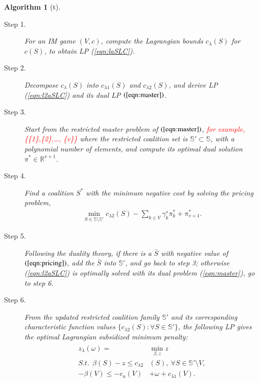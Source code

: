 \documentclass[authoryear,review,12pt]{elsarticle}
\newtheorem{algorithm}{Algorithm}
\newcommand{\R}{\mathbb{R}}
\begin{document}
\renewcommand{\baselinestretch}{1.5}
\begin{algorithm}[t]
\caption{LRB Algorithm to Compute $z_{\lambda}(\omega)$}
\label{alg:SPC}
\begin{description}
\item[Step 1.] For an IM game $(V,c)$, compute the Lagrangian bounds $c_{\lambda}(S)$ for $c(S)$, to obtain LP (\ref{eqn:laSLC}).

\item[Step 2.] Decompose $c_{\lambda}(S)$ into $c_{\lambda 1}(S)$ and $c_{\lambda 2}(S)$, and derive LP (\ref{eqn:l2aSLC}) and its dual LP $(\ref{eqn:master})$.

\item[Step 3.] Start from the restricted master problem of $(\ref{eqn:master})$,
\textcolor{red}{for example, \{\{1\},\{2\},\ldots, \{v\}\}}
where the restricted coalition set is $\mathbb{S}' \subset \mathbb{S}$, with a polynomial number of elements, and compute its optimal dual solution $\pi^{*} \in \R^{v+1}$.
\item[Step 4.] Find a coalition $S^*$ with the minimum negative cost by solving the pricing problem,
\begin{eqnarray}\label{eqn:pricing}
\min_{S\in \mathbb{S}\setminus \mathbb{S}'} c_{\lambda2}(S) - \sum_{ k \in V} \gamma^s_k \pi_{k}^{*} + \pi_{v+1}^*.
\end{eqnarray}
\item[Step 5.] Following the duality theory, if there is a $\bar{S}$ with negative value of $(\ref{eqn:pricing})$, add the $\bar{S}$ into $\mathbb{S}'$, and go back to step 3; otherwise (\ref{eqn:l2aSLC}) is optimally solved with its dual problem (\ref{eqn:master}), go to step 6.

\item[Step 6.] From the updated restricted coalition family $\mathbb{S}'$ and its corresponding characteristic function values $\{c_{\lambda2}(S):\forall S \in \mathbb{S}' \}$, the following LP gives the optimal Lagrangian subsidized minimum penalty:
\begin{eqnarray}\label{eqn:alpha2}
\begin{aligned}
z_{\lambda}(\omega) = &\min_{\beta,z} z\\
S.t.~~ \beta(S) - z \leq  c_{\lambda2}&(S),~ \forall S \in \mathbb{S}' \setminus V,\\
-\beta(V) \leq  -c_u(V) &+ \omega  + c_{\lambda1}(V).
\end{aligned}
\end{eqnarray}
\vspace{-8mm}
\end{description}
\end{algorithm}
\end{document}
